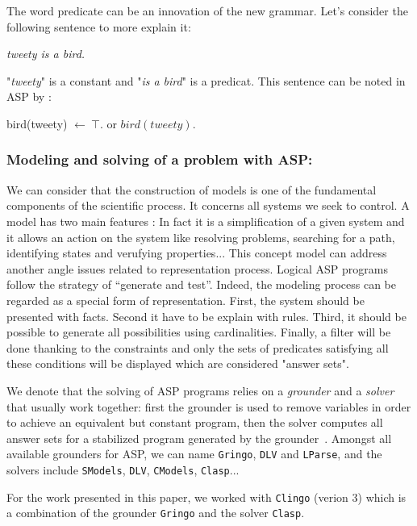\begin{enumerate}
The word predicate can be an innovation of the new grammar. Let's consider the following sentence to more explain it: 
\begin{tabbing}
 \textit{tweety is a bird.} 
\end{tabbing}
"\textit{tweety}" is a constant and "\textit{is a bird}" is a predicat. This sentence can be noted in ASP by :
\begin{tabbing}
 bird(tweety) $\leftarrow ~ \top$. \hspace{1cm} or \hspace{2cm} $bird(tweety) .$
\end{tabbing} 
\end{enumerate}

\subsubsection{Modeling and solving of a problem with ASP: } 

We can consider that the construction of models is one of the fundamental components of the scientific process. It concerns all systems we seek to control. A model has two main features \cite{Glimpse}: In fact it is a simplification of a given system and it allows an action on the system like resolving problems, searching for a path, identifying states and verufying properties... This concept model can address another angle issues related to representation process. Logical ASP programs follow the strategy of “generate and test”. Indeed, the modeling process can be regarded as a special form of representation. First, the system should be presented  with facts. Second it have to be explain with rules. Third, it should be possible to generate all possibilities using cardinalities. Finally, a filter will be done thanking to the constraints and only the sets of predicates satisfying all these conditions will be displayed which are considered "answer sets".

We denote that the solving of ASP programs relies on a \emph{grounder} and a \emph{solver}
that usually work together:
first the grounder is used to remove variables in order to achieve an equivalent but constant program,
then the solver computes all answer sets for a stabilized program generated by the grounder~\cite{Vladimir,AnsPrologAPE}.
Amongst all available grounders for ASP, we can name
\texttt{Gringo}, \texttt{DLV} and \texttt{LParse},
and the solvers include
\texttt{SModels}, \texttt{DLV}, \texttt{CModels}, \texttt{Clasp}...

For the work presented in this paper, we worked with \texttt{Clingo} (verion 3) which is a combination of the grounder \texttt{Gringo} and the solver \texttt{Clasp}.

